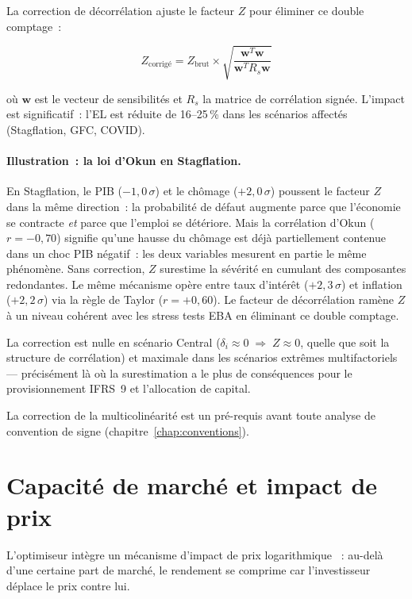 \documentclass[10pt, a4paper, oneside]{report}
\theoremstyle{definition}
\begin{document}
La correction de décorrélation ajuste le facteur $Z$ pour éliminer ce double comptage~:

\begin{equation}
Z_{\text{corrigé}} = Z_{\text{brut}} \times \sqrt{\frac{\mathbf{w}^T \mathbf{w}}{\mathbf{w}^T R_s \mathbf{w}}}
\label{eq:decorrelation}
\end{equation}

\noindent où $\mathbf{w}$ est le vecteur de sensibilités et $R_s$ la matrice de corrélation signée. L'impact est significatif~: l'EL est réduite de 16--25\,\% dans les scénarios affectés (Stagflation, GFC, COVID). \paragraph{Illustration~: la loi d'Okun en Stagflation.} En Stagflation, le PIB ($-1{,}0\,\sigma$) et le chômage ($+2{,}0\,\sigma$) poussent le facteur $Z$ dans la même direction~: la probabilité de défaut augmente parce que l'économie se contracte \emph{et} parce que l'emploi se détériore. Mais la corrélation d'Okun ($r = -0{,}70$) signifie qu'une hausse du chômage est déjà partiellement contenue dans un choc PIB négatif~: les deux variables mesurent en partie le même phénomène. Sans correction, $Z$ surestime la sévérité en cumulant des composantes redondantes. Le même mécanisme opère entre taux d'intérêt ($+2{,}3\,\sigma$) et inflation ($+2{,}2\,\sigma$) via la règle de Taylor ($r = +0{,}60$). Le facteur de décorrélation ramène $Z$ à un niveau cohérent avec les stress tests EBA en éliminant ce double comptage.

La correction est nulle en scénario Central ($\delta_i \approx 0 \;\Rightarrow\; Z \approx 0$, quelle que soit la structure de corrélation) et maximale dans les scénarios extrêmes multifactoriels --- précisément là où la surestimation a le plus de conséquences pour le provisionnement IFRS~9 et l'allocation de capital.

La correction de la multicolinéarité est un pré-requis avant toute analyse de convention de signe (chapitre~\ref{chap:conventions}).


\section{Capacité de marché et impact de prix}
\label{sec:ch3:impact}

L'optimiseur intègre un mécanisme d'impact de prix logarithmique \citep{kyle1985}~: au-delà d'une certaine part de marché, le rendement se comprime car l'investisseur déplace le prix contre lui.
\end{document}
